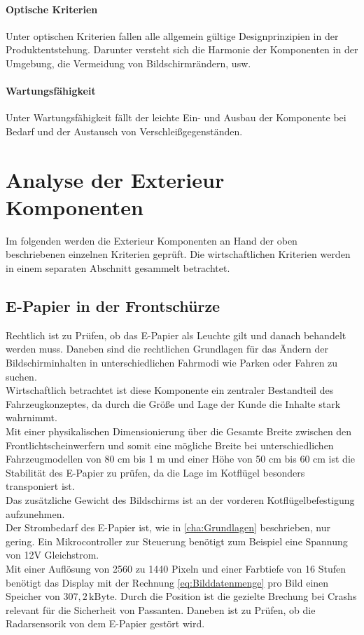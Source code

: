 \paragraph{Optische Kriterien}
Unter optischen Kriterien fallen alle allgemein gültige Designprinzipien in der Produktentstehung. Darunter versteht sich die Harmonie der Komponenten in der Umgebung, die Vermeidung von Bildschirmrändern, usw.
\paragraph{Wartungsfähigkeit}
Unter Wartungsfähigkeit fällt der leichte Ein- und Ausbau der Komponente bei Bedarf und der Austausch von Verschleißgegenständen.

\section{Analyse der Exterieur Komponenten}
Im folgenden werden die Exterieur Komponenten an Hand der oben beschriebenen einzelnen Kriterien geprüft. Die wirtschaftlichen Kriterien werden in einem separaten Abschnitt gesammelt betrachtet. 
\subsection{E-Papier in der Frontschürze}
Rechtlich ist zu Prüfen, ob das E-Papier als Leuchte gilt und danach behandelt werden muss. Daneben sind die rechtlichen Grundlagen für das Ändern der Bildschirminhalten in unterschiedlichen Fahrmodi wie Parken oder Fahren zu suchen. \\
Wirtschaftlich betrachtet ist diese Komponente ein zentraler Bestandteil des Fahrzeugkonzeptes, da durch die Größe und Lage der Kunde die Inhalte stark wahrnimmt. \\
Mit einer physikalischen Dimensionierung über die Gesamte Breite zwischen den Frontlichtscheinwerfern und somit eine mögliche Breite bei unterschiedlichen Fahrzeugmodellen von 80 cm bis 1 m und einer Höhe von 50 cm bis 60 cm ist die Stabilität des E-Papier zu prüfen, da die Lage im Kotflügel besonders transponiert ist. \\ 
Das zusätzliche Gewicht des Bildschirms ist an der vorderen Kotflügelbefestigung aufzunehmen.\\
Der Strombedarf des E-Papier ist, wie in \ref{cha:Grundlagen} beschrieben, nur gering. Ein Mikrocontroller zur Steuerung benötigt zum Beispiel eine Spannung von 12V Gleichstrom. \\
Mit einer Auflösung von 2560 zu 1440 Pixeln und einer Farbtiefe von 16 Stufen benötigt das Display mit der Rechnung \ref{eq:Bilddatenmenge} pro Bild einen Speicher von $ 307,2\,\mathrm{kByte} $. 
Durch die Position ist die gezielte Brechung bei Crashs relevant für die Sicherheit von Passanten.
Daneben ist zu Prüfen, ob die Radarsensorik von dem E-Papier gestört wird.\\
